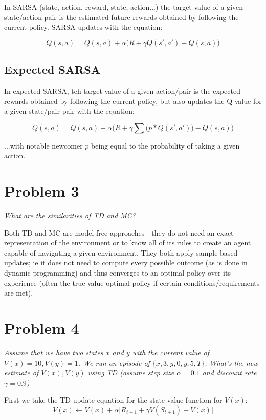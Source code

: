 \documentclass{article}
\begin{document}
In SARSA (state, action, reward, state, action...) the target value of a given state/action pair is the estimated future rewards obtained by following the current policy. SARSA updates with the equation:

\begin{equation}
    Q(s,a) = Q(s,a) + \alpha \biggl( R + \gamma Q(s',a') - Q(s,a) \biggr)
\end{equation}

\subsection*{Expected SARSA}

In expected SARSA, teh target value of a given action/pair is the expected rewards  obtained by following the current policy, but also updates the Q-value for a given state/pair pair with the equation:

\begin{equation}
    Q(s,a) = Q(s,a) + \alpha \biggl( R + \gamma \sum\bigl( p * Q(s',a') \bigr) - Q(s,a)  \biggr)
\end{equation}

\noindent ...with notable newcomer $p$ being equal to the probability of taking a given action.


\section*{Problem 3}
\textit{What are the similarities of TD and MC?}

Both TD and MC are model-free approaches - they do not need an exact representation of the environment or to know all of its rules to create an agent capable of navigating a given environment. They both apply sample-based updates; ie it does not need to compute every possible outcome (as is done in dynamic programming) and thus converges to an optimal policy over its experience (often the true-value optimal policy if certain conditions/requirements are met).

\section*{Problem 4}
\textit{Assume that we have two states $x$ and $y$ with the current value of $V(x)=10, V(y)=1$. We run an episode of $\{ x, 3, y, 0, y, 5, T \}$. What’s the new estimate of $V(x),V(y)$ using TD (assume step size $\alpha = 0.1$ and discount rate $\gamma = 0.9$)}

First we take the TD update equation for the state value function for $V(x)$:
\begin{equation}
V(x) \leftarrow V(x) + \alpha \biggl[ R_{t+1} + \gamma V(S_{t+1}) - V(x) \biggr]
\end{equation}
\end{document}

